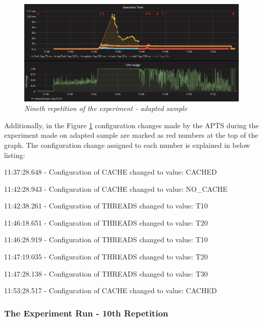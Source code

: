 \documentclass[12pt,a4paper]{article}
\let\tmpone\enumerate
\let\tmptwo\endenumerate
\renewenvironment{enumerate}{\tmpone\addtolength{\itemsep}{-0.4\baselineskip}}{\tmptwo}
\begin{document}
\begin{figure}[!htb]
\centering
\includegraphics[width=1\textwidth]{9-adap}
\caption{\textit{Nineth repetition of the experiment - adapted sample}} \label{figure:random:screen:adapted:9}
\end{figure}

Additionally, in the Figure \ref{figure:random:screen:adapted:9} configuration changes made by the APTS during the experiment made on adapted sample are marked as red numbers at the top of the graph. The configuration change assigned to each number is explained in below listing: 

\begin{enumerate}
\item 11:37:28.648 - Configuration of CACHE changed to value: CACHED
\item 11:42:28.943 - Configuration of CACHE changed to value: NO\_CACHE
\item 11:42:38.261 - Configuration of THREADS changed to value: T10
\item 11:46:18.651 - Configuration of THREADS changed to value: T20
\item 11:46:28.919 - Configuration of THREADS changed to value: T10
\item 11:47:19.035 - Configuration of THREADS changed to value: T20
\item 11:47:28.138 - Configuration of THREADS changed to value: T30
\item 11:53:28.517 - Configuration of CACHE changed to value: CACHED
\end{enumerate}





\subsubsection{The Experiment Run - 10th Repetition}
\end{document}
